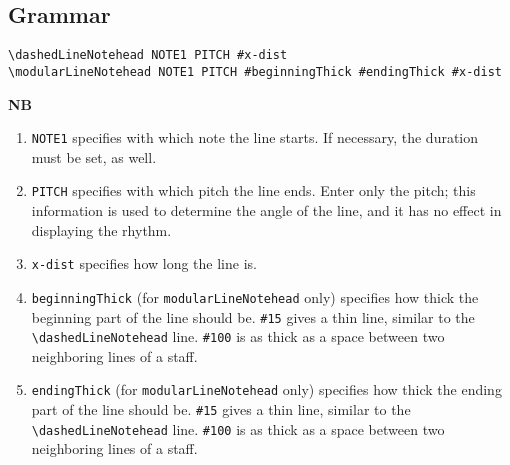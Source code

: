 \documentclass[11pt, oneside]{book}   	%
\begin{document}
\subsection{Grammar}
\begin{verbatim}
\dashedLineNotehead NOTE1 PITCH #x-dist
\modularLineNotehead NOTE1 PITCH #beginningThick #endingThick #x-dist
\end{verbatim}

\textbf{NB} 
\begin{enumerate} 
\item \verb|NOTE1| specifies with which note the line starts. If necessary, the duration must be set, as well.
\item \verb|PITCH| specifies with which pitch the line ends. Enter only the pitch; this information is used to determine the angle of the line, and it has no effect in displaying the rhythm.  
\item \verb|x-dist| specifies how long the line is.  
\item \verb|beginningThick| (for \verb|modularLineNotehead| only) specifies how thick the beginning part of the line should be. \verb|#15| gives a thin line, similar to the \verb|\dashedLineNotehead| line. \verb|#100| is as thick as a space between two neighboring lines of a staff.
\item \verb|endingThick| (for \verb|modularLineNotehead| only) specifies how thick the ending part of the line should be. \verb|#15| gives a thin line, similar to the \verb|\dashedLineNotehead| line. \verb|#100| is as thick as a space between two neighboring lines of a staff.
\end{enumerate}
\end{document}
